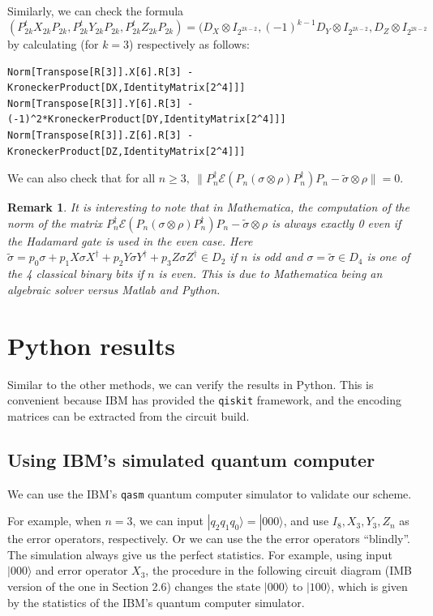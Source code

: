 \documentclass[11pt]{article}
\newtheorem{remark}[theorem]{Remark}
\def\cE{{\mathcal E}}
\def\ra{{\rangle}}
\begin{document}
\noindent Similarly, we can check the formula
$$(P_{2k}^t X_{2k}P_{2k}, P_{2k}^t Y_{2k}P_{2k}, 
P_{2k}^t Z_{2k}P_{2k}) 
= 
 (D_X \otimes I_{2^{2k-2}}, (-1)^{k-1}D_Y \otimes I_{2^{2k-2}}, 
 D_Z \otimes I_{2^{2k-2}} $$
by calculating (for $k=3$) respectively as follows:
\begin{verbatim}
Norm[Transpose[R[3]].X[6].R[3] - KroneckerProduct[DX,IdentityMatrix[2^4]]]
Norm[Transpose[R[3]].Y[6].R[3] - (-1)^2*KroneckerProduct[DY,IdentityMatrix[2^4]]]
Norm[Transpose[R[3]].Z[6].R[3] - KroneckerProduct[DZ,IdentityMatrix[2^4]]]
\end{verbatim}

\noindent We can also check that for all $n\ge 3,\ \|P_n^\dag \cE( P_n (\sigma \otimes \rho) P_n^\dag) P_n  
-\tilde \sigma \otimes \rho\|=0$.

\begin{remark} \rm It is interesting to note that in Mathematica,
the computation of the norm of the matrix 
$P_n^\dag \cE( P_n (\sigma \otimes \rho) P_n^\dag) P_n  
-\tilde \sigma \otimes \rho$ is always exactly 0 even if the Hadamard
gate is used in the even case.
Here $\tilde \sigma  = p_0 \sigma + p_1 X\sigma X^\dag + p_2 Y \sigma Y^\dag 
+ p_3 Z \sigma Z^\dag \in D_2$ if $n$ is odd and 
$\sigma = \tilde \sigma \in D_4$ is one of the 4 classical binary bits if 
$n$ is even. This is due to Mathematica being an algebraic solver versus Matlab and Python.
\end{remark}

\section{Python results}
Similar to the other methods, we can verify the results in Python. 
This is convenient because IBM has provided the \verb|qiskit| framework, and the encoding matrices
can be extracted from the circuit build.



\subsection{Using IBM's simulated quantum computer}

We can use the IBM's \verb|qasm| quantum computer simulator to validate our scheme. 

\noindent
For example, when $n = 3$, we can input $|q_2q_1q_0\ra = |000\ra$,
and use $I_8, X_3, Y_3, Z_n$ as the error operators, respectively. Or we can use the 
the error operators  ``blindly''. The simulation always give us the perfect statistics.
For example, using input $|000\ra$ and error operator $X_3$, 
the procedure in the following circuit diagram (IMB version of the one in Section 2.6) 
changes the state $|000\ra$ to $|100\ra$, which is given 
by the statistics of the IBM's quantum computer simulator.
\end{document}
